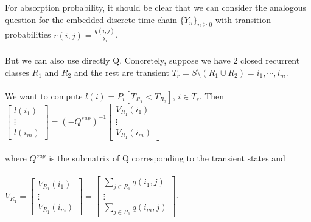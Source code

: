 \documentclass[12pt]{article}
\begin{document}
For absorption probability, it should be clear that we can consider the analogous question for the embedded discrete-time chain $\{Y_n\}_{n\geq0}$ with transition probabilities $r(i,j)=\frac{q(i,j)}{\lambda_i}$.
\\
\\But we can also use directly Q. Concretely, suppose we have 2 closed recurrent classes $R_1$ and $R_2$ and the rest are transient $T_r = S \setminus (R_1 \cup R_2) = {i_1, \cdots, i_m}$.
\\
\\We want to compute $l(i) = P_i[T_{R_1} < T_{R_2}]$, $i \in T_r$. Then $\begin{bmatrix}
l(i_1) \\
\vdots \\
l(i_m)
\end{bmatrix} = (-Q^{sup})^{-1}\begin{bmatrix}
V_{R_1}(i_1) \\
\vdots \\
V_{R_1}(i_m)
\end{bmatrix}$\\
\\where $Q^{sup}$ is the submatrix of Q corresponding to the transient states and\\
\\$V_{R_1} = \begin{bmatrix}
V_{R_1}(i_1) \\
\vdots \\
V_{R_1}(i_m)
\end{bmatrix} = \begin{bmatrix}
\sum_{j \in R_1} q(i_1,j)\\
\vdots \\
\sum_{j \in R_1} q(i_m,j)
\end{bmatrix}$.
\end{document}
